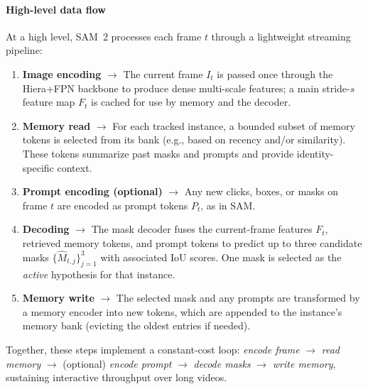 \begin{enrichment}
\begin{enrichment}
		\paragraph{High-level data flow}
		At a high level, SAM~2 processes each frame \(t\) through a lightweight streaming pipeline:
		\begin{enumerate}
			\item \textbf{Image encoding} \(\rightarrow\) The current frame \(I_t\) is passed once through the Hiera+FPN backbone to produce dense multi-scale features; a main stride-\(s\) feature map \(F_t\) is cached for use by memory and the decoder.
			\item \textbf{Memory read} \(\rightarrow\) For each tracked instance, a bounded subset of memory tokens is selected from its bank (e.g., based on recency and/or similarity). These tokens summarize past masks and prompts and provide identity-specific context.
			\item \textbf{Prompt encoding (optional)} \(\rightarrow\) Any new clicks, boxes, or masks on frame \(t\) are encoded as prompt tokens \(P_t\), as in SAM.
			\item \textbf{Decoding} \(\rightarrow\) The mask decoder fuses the current-frame features \(F_t\), retrieved memory tokens, and prompt tokens to predict up to three candidate masks \(\{\hat{M}_{t,j}\}_{j=1}^3\) with associated IoU scores. One mask is selected as the \emph{active} hypothesis for that instance.
			\item \textbf{Memory write} \(\rightarrow\) The selected mask and any prompts are transformed by a memory encoder into new tokens, which are appended to the instance’s memory bank (evicting the oldest entries if needed).
		\end{enumerate}
		Together, these steps implement a constant-cost loop: \emph{encode frame} \(\to\) \emph{read memory} \(\to\) (optional) \emph{encode prompt} \(\to\) \emph{decode masks} \(\to\) \emph{write memory}, sustaining interactive throughput over long videos.
		
		\newpage
		

\end{enrichment}
\end{enrichment}
